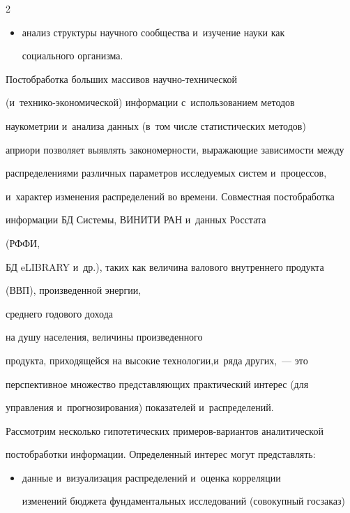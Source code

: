 \begin{multicols}{2}
\begin{itemize}
    \item анализ структуры научного сообщества и~изуче\-ние науки как 

социального организма.

    \end{itemize}

    

    Постобработка больших массивов на\-уч\-но-тех\-ни\-че\-ской  

(и~тех\-ни\-ко-эко\-но\-ми\-че\-ской) информации с~использованием методов 

наукометрии и~анализа данных (в~том чис\-ле статистических методов) 

\mbox{априори} позволяет выявлять закономерности, выражающие зависимости между 

распределениями различных па\-ра\-мет\-ров исследуемых сис\-тем и~процессов, 

и~характер изменения распределений во времени. Совместная постобработка 

информации БД Сис\-те\-мы, ВИНИТИ РАН и~данных Росстата\linebreak

 (РФФИ, 

БД eLIBRARY и~др.), таких как величина валового внут\-рен\-не\-го продукта

(ВВП), про\-из\-веденной энергии, 

среднего годового дохода\linebreak

 на душу населения, величины произведенного 

продукта, приходящейся на высокие технологии,\linebreak и~ряда других,~--- это 

перспективное множество пред\-став\-ля\-ющих практический интерес (для 

управ\-ле\-ния и~прогнозирования) показателей и~распределений. 

    

    Рассмотрим несколько гипотетических при\-ме\-ров-ва\-ри\-ан\-тов аналитической 

постобработки информации. Определенный интерес могут пред\-став\-лять:

    \begin{itemize}

    \item данные и~визуализация распределений и~оценка корреляции 

изменений бюджета фундаментальных исследований (совокупный госзаказ) 


\end{itemize}
\end{multicols}
